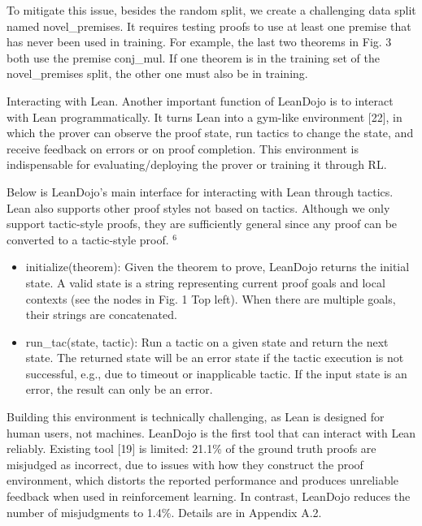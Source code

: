 \documentclass[
]{article}
\providecommand{\tightlist}{%
  \setlength{\itemsep}{0pt}\setlength{\parskip}{0pt}}
\begin{document}
To mitigate this issue, besides the random split, we create a
challenging data split named novel\_premises. It requires testing proofs
to use at least one premise that has never been used in training. For
example, the last two theorems in Fig. 3 both use the premise conj\_mul.
If one theorem is in the training set of the novel\_premises split, the
other one must also be in training.

Interacting with Lean. Another important function of LeanDojo is to
interact with Lean programmatically. It turns Lean into a gym-like
environment {[}22{]}, in which the prover can observe the proof state,
run tactics to change the state, and receive feedback on errors or on
proof completion. This environment is indispensable for
evaluating/deploying the prover or training it through RL.

Below is LeanDojo's main interface for interacting with Lean through
tactics. Lean also supports other proof styles not based on tactics.
Although we only support tactic-style proofs, they are sufficiently
general since any proof can be converted to a tactic-style proof.
\(^{6}\)

\begin{itemize}
\tightlist
\item
  initialize(theorem): Given the theorem to prove, LeanDojo returns the
  initial state. A valid state is a string representing current proof
  goals and local contexts (see the nodes in Fig. 1 Top left). When
  there are multiple goals, their strings are concatenated.\\
\item
  run\_tac(state, tactic): Run a tactic on a given state and return the
  next state. The returned state will be an error state if the tactic
  execution is not successful, e.g., due to timeout or inapplicable
  tactic. If the input state is an error, the result can only be an
  error.
\end{itemize}

Building this environment is technically challenging, as Lean is
designed for human users, not machines. LeanDojo is the first tool that
can interact with Lean reliably. Existing tool {[}19{]} is limited:
21.1\% of the ground truth proofs are misjudged as incorrect, due to
issues with how they construct the proof environment, which distorts the
reported performance and produces unreliable feedback when used in
reinforcement learning. In contrast, LeanDojo reduces the number of
misjudgments to 1.4\%. Details are in Appendix A.2.
\end{document}
